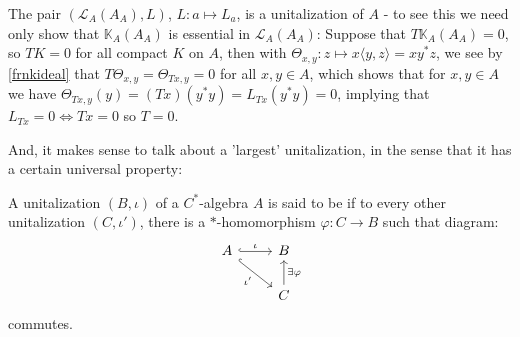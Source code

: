 \begin{example}
	The pair $(\mathcal{L}_A(A_A),L)$, $L\colon a \mapsto L_a$, is a unitalization of $A$ - to see this we need only show that $\mathbb{K}_A(A_A)$ is essential in $\mathcal{L}_A(A_A)$: Suppose that $T \mathbb{K}_A(A_A)=0$, so $TK = 0$ for all compact $K$ on $A$, then with $\Theta_{x,y} \colon z \mapsto x\langle y,z\rangle = xy^*z$, we see by \ref{frnkideal} that $T \Theta_{x,y}=\Theta_{Tx,y}= 0$ for all $x, y \in A$, which shows that for $x,y \in A$ we have $\Theta_{Tx,y}(y) = (Tx)(y^*y)=L_{Tx}(y^*y)=0$, implying that $L_{Tx}=0 \iff Tx = 0$ so $T=0$. 
	\label{mult:compess}
\end{example}
And, it makes sense to talk about a 'largest' unitalization, in the sense that it has a certain universal property:
\begin{definition}
	A unitalization $(B, \iota)$ of a $C^*$-algebra $A$ is said to be  if to every other unitalization $(C,\iota')$, there is a $*$-homomorphism $\varphi \colon C \to B$ such that diagram:
	\begin{equation}
	\begin{tikzcd}
		A\arrow[dr,"\iota'"', hook] \arrow[r, "\iota", hook] & B \\
		& C \arrow[u, "\exists \varphi"']
	\end{tikzcd}
	\end{equation}
	commutes.
	\label{mult:defmaxun}
\end{definition}

